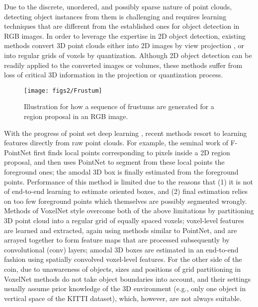 \documentclass[letterpaper, 10 pt, conference]{ieeeconf}
\begin{document}
Due to the discrete, unordered, and possibly sparse nature of point clouds, detecting object instances from them is challenging and requires learning techniques that are different from the established ones \cite{girshick2015fast, ren2015faster, liu2016ssd} for object detection in RGB images. In order to leverage the expertise in 2D object detection, existing methods convert 3D point clouds either into 2D images by view projection \cite{li2016vehicle, chen2017multi, ku2018joint}, or into regular grids of voxels by quantization\cite{li20173d, wang2015voting, yang2018pixor, liang2018deep}. Although 2D object detection can be readily applied to the converted images or volumes, these methods suffer from loss of critical 3D information in the projection or quantization process.

\begin{figure}
	\begin{center}
	\texttt{[image: figs2/Frustum]}
	\caption[]{Illustration for how a sequence of frustums are generated for a region proposal in an RGB image. }
	\label{Fig:Frustum}
	\end{center}
	\vspace{-0.5cm}
\end{figure}

With the progress of point set deep learning \cite{qi2017pointnet, qi2017pointnet++},  recent methods \cite{qi2018frustum, zhou2018voxelnet} resort to learning features directly from raw point clouds. For example, the seminal work of F-PointNet\cite{qi2018frustum} first finds local points corresponding to pixels inside a 2D region proposal, and then uses PointNet\cite{qi2017pointnet} to segment from these local points the foreground ones; the amodal 3D box is finally estimated from the foreground points. Performance of this method is limited due to the reasons that (1) it is not of end-to-end learning to estimate oriented boxes,  and (2) final estimation relies on too few foreground points which themselves are possibly segmented wrongly.
Methods of VoxelNet style\cite{zhou2018voxelnet, yan2018second, lang2018pointpillars} overcome both of the above limitations by partitioning 3D point cloud into a regular grid of equally spaced voxels; voxel-level features are learned and extracted, again using methods similar to PointNet\cite{qi2017pointnet}, and are arrayed together to form feature maps that are processed subsequently by convolutional (conv) layers; amodal 3D boxes are estimated in an end-to-end fashion using spatially convolved voxel-level features. For the other side of the coin, due to unawareness of objects, sizes and positions of grid partitioning in VoxelNet\cite{zhou2018voxelnet} methods do not take object boundaries into account, and their settings usually assume prior knowledge of the 3D environment (e.g., only one object in vertical space of the KITTI dataset\cite{geiger2012we}), which, however, are not always suitable.
\end{document}
